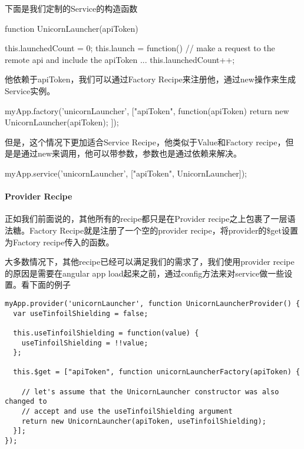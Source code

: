 	  下面是我们定制的Service的构造函数
	  
	  \begin{JavaScript}
function UnicornLauncher(apiToken) {
 
  this.launchedCount = 0;
  this.launch = function() {
    // make a request to the remote api and include the apiToken
    ...
    this.launchedCount++;
  }
}	  
	  \end{JavaScript}

	他依赖于apiToken，我们可以通过Factory Recipe来注册他，通过new操作来生成Service实例。

	\begin{JavaScript}
myApp.factory('unicornLauncher', ["apiToken", function(apiToken) {
  return new UnicornLauncher(apiToken);
}]);	
	\end{JavaScript}	
	
	但是，这个情况下更加适合Service Recipe，他类似于Value和Factory recipe，但是是通过new来调用，他可以带参数，参数也是通过依赖来解决。
	
	\begin{JavaScript}
myApp.service('unicornLauncher', ["apiToken", UnicornLauncher]);	
	\end{JavaScript}  
	
	
	
	\paragraph{Provider Recipe}
	
	
	正如我们前面说的，其他所有的recipe都只是在Provider recipe之上包裹了一层语法糖。Factory Recipe就是注册了一个空的provider recipe，将provider的\$get设置为Factory recipe传入的函数。
	
	大多数情况下，其他recipe已经可以满足我们的需求了，我们使用provider recipe的原因是需要在angular app load起来之前，通过config方法来对service做一些设置。看下面的例子
	
	\begin{lstlisting}
myApp.provider('unicornLauncher', function UnicornLauncherProvider() {
  var useTinfoilShielding = false;
 
  this.useTinfoilShielding = function(value) {
    useTinfoilShielding = !!value;
  };
 
  this.$get = ["apiToken", function unicornLauncherFactory(apiToken) {
 
    // let's assume that the UnicornLauncher constructor was also changed to
    // accept and use the useTinfoilShielding argument
    return new UnicornLauncher(apiToken, useTinfoilShielding);
  }];
});	
	\end{lstlisting}  
	
